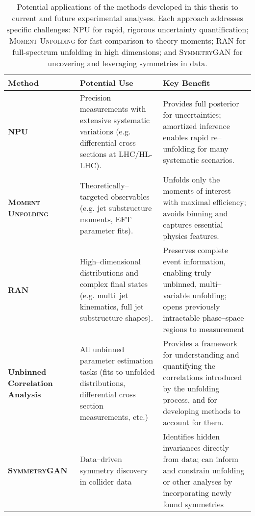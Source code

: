         \begin{table}
            \centering
            \begin{tabular}{p{3.5cm} p{5.8cm} p{6.5cm}}
                \textbf{Method} & \textbf{Potential Use} & \textbf{Key Benefit} \\
                \hline
                \textbf{NPU}
                & Precision measurements with extensive systematic variations (e.g. differential cross sections at LHC/HL-LHC).
                & Provides full posterior for uncertainties; amortized inference enables rapid re--unfolding for many systematic scenarios. \\
                \textbf{\textsc{Moment Unfolding}}
                & Theoretically--targeted observables (e.g. jet substructure moments, EFT parameter fits).
                & Unfolds only the moments of interest with maximal efficiency; avoids binning and captures essential physics features. \\
                \textbf{RAN}
                & High--dimensional distributions and complex final states (e.g. multi--jet kinematics, full jet substructure shapes).
                & Preserves complete event information, enabling truly unbinned, multi--variable unfolding; opens previously intractable phase--space regions to measurement \\
                \textbf{Unbinned Correlation Analysis}
                & All unbinned parameter estimation tasks (fits to unfolded distributions, differential cross section measurements, etc.)
                & Provides a framework for understanding and quantifying the correlations introduced by the unfolding process, and for developing methods to account for them. \\
                \textbf{\textsc{SymmetryGAN}}
                & Data--driven symmetry discovery in collider data
                & Identifies hidden invariances directly from data; can inform and constrain unfolding or other analyses by incorporating newly found symmetries\\
            \end{tabular}
            \caption[Applications of methods to experimental scenarios]{
                Potential applications of the methods developed in this thesis to current and future experimental analyses. Each approach addresses specific challenges: NPU for rapid, rigorous uncertainty quantification; \textsc{Moment Unfolding} for fast comparison to theory moments; RAN for full-spectrum unfolding in high dimensions; and \textsc{SymmetryGAN} for uncovering and leveraging symmetries in data.
            }
            \label{tab:method_applications}
        \end{table}
